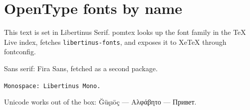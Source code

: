 \documentclass[12pt]{article}
\begin{document}
\section*{OpenType fonts by name}
This text is set in Libertinus Serif. pomtex looks up the font family in the
TeX Live index, fetches \texttt{libertinus-fonts}, and exposes it to XeTeX
through fontconfig.

\textsf{Sans serif: Fira Sans, fetched as a second package.}

\texttt{Monospace: Libertinus Mono.}

Unicode works out of the box: Ğüşıöç — Αλφάβητο — Привет.
\end{document}
